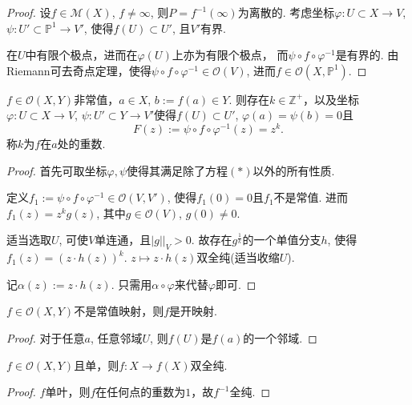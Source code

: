 \begin{proof}
	设$f\in \mathscr{M}(X)$, $f\neq \infty$, 则$P=f^{-1}(\infty)$为离散的. 
    考虑坐标$\varphi\colon U\subset X\rightarrow V$, 
    $\psi\colon U'\subset \mathbb{P}^1\rightarrow V'$, 
    使得$f(U)\subset U'$, 且$V'$有界.

	在$U$中有限个极点，进而在$\varphi(U)$上亦为有限个极点，
    而$\psi\circ f\circ \varphi^{-1}$是有界的. 
    由Riemann可去奇点定理，使得$\psi\circ f\circ \varphi^{-1}\in \mathcal{O}(V)$, 
    进而$f\in \mathcal{O}(X,\mathbb{P}^1)$.
\end{proof}
	
\begin{theorem}[全纯映射局部行为]
	$f\in \mathcal{O}(X,Y)$非常值，$a\in X$, $b:=f(a)\in Y$. 
    则存在$k\in \mathbb{Z}^+$，以及坐标$\varphi\colon U\subset X\rightarrow V$, 
    $\psi\colon U'\subset Y\rightarrow V'$使得$f(U)\subset U'$, 
    $\varphi(a)=\psi(b)=0$且
	\[F(z):=\psi\circ f\circ \varphi^{-1}(z)=z^k.\tag{$*$}\]
	称$k$为$f$在$a$处的重数.
\end{theorem}
	
\begin{proof}
	首先可取坐标$\varphi, \psi$使得其满足除了方程$(*)$以外的所有性质.

	定义$f_1:=\psi\circ f\circ \varphi^{-1}\in \mathcal{O}(V,V')$, 
    使得$f_1(0)=0$且$f_1$不是常值. 进而$f_1(z)=z^kg(z)$, 
    其中$g\in \mathcal{O}(V)$, $g(0)\neq 0$. 

	适当选取$U$, 可使$V$单连通，且$|g||_V>0$. 
    故存在$g^\frac{1}{k}$的一个单值分支$h$, 使得$f_1(z)=(z\cdot h(z))^k$. 
    $z\mapsto z\cdot h(z)$双全纯(适当收缩$U$).

	记$\alpha(z):=z\cdot h(z)$. 只需用$\alpha\circ \varphi$来代替$\varphi$即可.
\end{proof}
		
	
\begin{corollary}[开映射]
    $f\in \mathcal{O}(X,Y)$不是常值映射，则$f$是开映射.\par
\end{corollary}
	\begin{proof}
        对于任意$a$, 任意邻域$U$, 则$f(U)$是$f(a)$的一个邻域.
    \end{proof}

\begin{corollary}
	$f\in \mathcal{O}(X,Y)$且单，则$f\colon X\rightarrow f(X)$双全纯. 
\end{corollary}
\begin{proof}
    $f$单叶，则$f$在任何点的重数为$1$，故$f^{-1}$全纯.
\end{proof}

